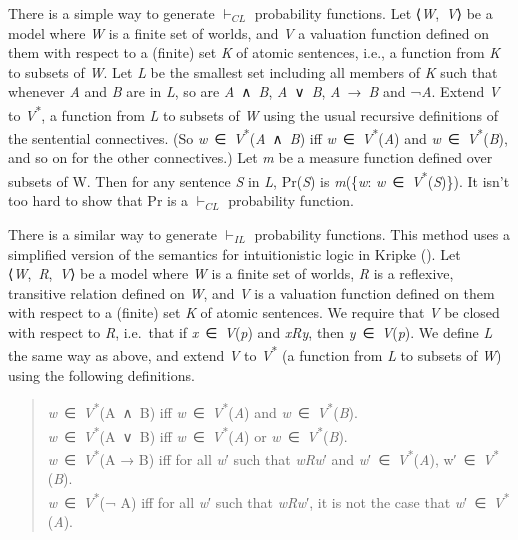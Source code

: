 \documentclass[
  11pt,
  letterpaper,
  DIV=11,
  numbers=noendperiod,
  twoside]{scrartcl}
\begin{document}
There is a simple way to generate \(\vdash_{CL}\) probability functions.
Let ⟨\emph{W},~\emph{V}⟩ be a model where \emph{W} is a finite set of
worlds, and \emph{V} a valuation function defined on them with respect
to a (finite) set \emph{K} of atomic sentences, i.e., a function from
\emph{K} to subsets of \emph{W}. Let \emph{L} be the smallest set
including all members of \emph{K} such that whenever \emph{A} and
\emph{B} are in \emph{L}, so are \emph{A}~∧~\emph{B},
\emph{A}~∨~\emph{B}, \emph{A}~→~\emph{B} and ¬\emph{A}. Extend \emph{V}
to \emph{V}\textsuperscript{*}, a function from \emph{L} to subsets of
\emph{W} using the usual recursive definitions of the sentential
connectives. (So
\emph{w}~∈~\emph{V}\textsuperscript{*}(\emph{A}~∧~\emph{B}) iff
\emph{w}~∈~\emph{V}\textsuperscript{*}(\emph{A}) and
\emph{w}~∈~\emph{V}\textsuperscript{*}(\emph{B}), and so on for the
other connectives.) Let \emph{m} be a measure function defined over
subsets of W. Then for any sentence \emph{S} in \emph{L}, Pr(\emph{S})
is \emph{m}(\{\emph{w}:
\emph{w}~∈~\emph{V}\textsuperscript{*}(\emph{S})\}). It isn't too hard
to show that Pr is a \(\vdash_{CL}\) probability function.

There is a similar way to generate \(\vdash_{IL}\) probability
functions. This method uses a simplified version of the semantics for
intuitionistic logic in Kripke (). Let
⟨\emph{W},~\emph{R},~\emph{V}⟩ be a model where \emph{W} is a finite set
of worlds, \emph{R} is a reflexive, transitive relation defined on
\emph{W}, and \emph{V} is a valuation function defined on them with
respect to a (finite) set \emph{K} of atomic sentences. We require that
\emph{V} be closed with respect to \emph{R}, i.e.~that if
\emph{x}~∈~\emph{V}(\emph{p}) and \emph{xRy}, then
\emph{y}~∈~\emph{V}(\emph{p}). We define \emph{L} the same way as above,
and extend \emph{V} to \emph{V}\textsuperscript{*} (a function from
\emph{L} to subsets of \emph{W}) using the following definitions.

\begin{quote}
\emph{w}~∈~\emph{V}\textsuperscript{*}(A~∧~B) iff
\emph{w}~∈~\emph{V}\textsuperscript{*}(\emph{A}) and
\emph{w}~∈~\emph{V}\textsuperscript{*}(\emph{B}).\\
\emph{w}~∈~\emph{V}\textsuperscript{*}(A~∨~B) iff
\emph{w}~∈~\emph{V}\textsuperscript{*}(\emph{A}) or
\emph{w}~∈~\emph{V}\textsuperscript{*}(\emph{B}).\\
\emph{w}~∈~\emph{V}\textsuperscript{*}(A → B) iff for all \emph{w}′ such
that \emph{wRw}′ and \emph{w}′~∈~\emph{V}\textsuperscript{*}(\emph{A}),
w′~∈~\emph{V}\textsuperscript{*}(\emph{B}).\\
\emph{w}~∈~\emph{V}\textsuperscript{*}(¬ A) iff for all \emph{w}′ such
that \emph{wRw}′, it is not the case that
\emph{w}′~∈~\emph{V}\textsuperscript{*}(\emph{A}).
\end{quote}
\end{document}
